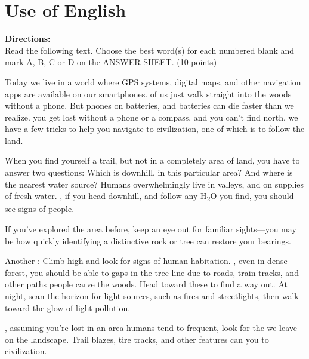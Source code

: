 
\section{Use of English}

\noindent
\textbf{Directions:}\\
Read the following text. Choose the best word(s) for each
numbered blank and mark A, B, C or D on the ANSWER SHEET. (10 points)



\TiGanSpace

Today we live in a world where GPS systems, digital maps, and
other navigation apps are available on our smartphones. \cloze of us just
walk straight into the woods without a phone. But phones  \cloze  on batteries,
and batteries can die faster than we realize.  \cloze  you get lost without a
phone or a compass, and you  \cloze  can't find north, we have a few tricks to
help you navigate  \cloze  to civilization, one of which is to follow the land.


When you find yourself  \cloze  a trail, but not in a completely  \cloze  area of land,
you have to answer two questions: Which  \cloze  is downhill, in this
particular area? And where is the nearest water source? Humans
overwhelmingly live in valleys, and on supplies of fresh water.  \cloze , if
you head downhill, and follow any H\textsubscript{2}O you find, you should  \cloze  see signs
of people. 

If you've explored the area before, keep an eye out for
familiar sights---you may be  \cloze  how quickly identifying a distinctive
rock or tree can restore your bearings.

 Another  \cloze  : Climb high
and look for signs of human habitation.  \cloze  , even in dense forest, you
should be able to  \cloze  gaps in the tree line due to roads, train tracks,
and other paths people carve  \cloze  the woods. Head toward these  \cloze  to find
a way out. At night, scan the horizon for  \cloze  light sources, such as
fires and streetlights, then walk toward the glow of light pollution.

 \cloze  , assuming you're lost in an area humans tend to frequent,
look for the  \cloze  we leave on the landscape. Trail blazes, tire tracks,
and other features can  \cloze  you to civilization.

\newpage

